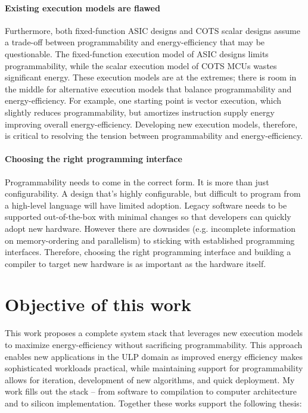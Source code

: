 \paragraph{Existing execution models are flawed}
Furthermore, both fixed-function ASIC designs and COTS scalar designs assume a trade-off between programmability and energy-efficiency that may be questionable.
% 
The fixed-function execution model of ASIC designs limits programmability, while the scalar execution model of COTS MCUs wastes significant energy.
% 
These execution models are at the extremes; there is room in the middle for alternative execution models that balance programmability and energy-efficiency.
% 
For example, one starting point is vector execution, which slightly reduces programmability, but amortizes instruction supply energy improving overall energy-efficiency.
% 
Developing new execution models, therefore, is critical to resolving the tension between programmability and energy-efficiency.

\paragraph{Choosing the right programming interface}
Programmability needs to come in the correct form.
% 
It is more than just configurability.
% 
A design that's highly configurable, but difficult to program from a high-level language will have limited adoption.
% 
Legacy software needs to be supported out-of-the-box with minimal changes so that developers can quickly adopt new hardware.
% 
However there are downsides (e.g. incomplete information on memory-ordering and parallelism) to sticking with established programming interfaces.
% 
Therefore, choosing the right programming interface and building a compiler to target new hardware is as important as the hardware itself.


\figOverview

\section{Objective of this work}

This work proposes a complete system stack that leverages new execution models to maximize energy-efficiency without sacrificing programmability.
% 
This approach enables new applications in the ULP domain as improved energy efficiency makes sophisticated workloads practical, while maintaining support for programmability allows for iteration, development of new algorithms, and quick deployment. 
% 
My work fills out the stack -- from software to compilation to computer architecture and to silicon implementation.
% 
Together these works support the following thesis:

